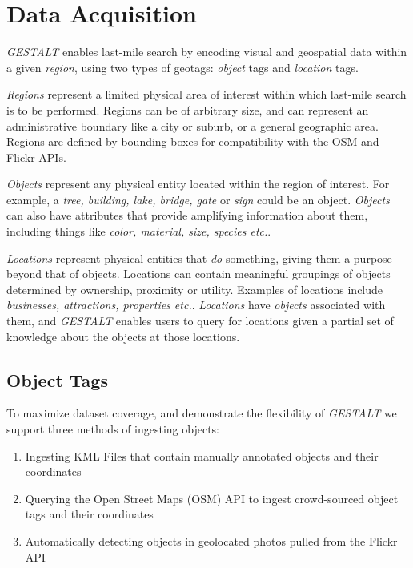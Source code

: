 \section{Data Acquisition}
\label{section:data}

\emph{GESTALT} enables last-mile search by encoding visual and geospatial data within a given \emph{region}, using two types of geotags: \emph{object} tags and \emph{location} tags.

\emph{Regions} represent a limited physical area of interest within which last-mile search is to be performed. 
Regions can be of arbitrary size, and can represent an administrative boundary like a city or suburb, or a general geographic area.
Regions are defined by bounding-boxes for compatibility with the OSM and Flickr APIs.


\emph{Objects} represent any physical entity located within the region of interest. 
For example, a \textit{tree, building, lake, bridge, gate} or \textit{sign} could be an object. 
\textit{Objects} can also have attributes that provide amplifying information about them, including things like \textit{color, material, size, species etc.}. 

\emph{Locations} represent physical entities that \textit{do} something, giving them a purpose beyond that of objects. 
Locations can contain meaningful groupings of objects determined by ownership, proximity or utility. 
Examples of locations include \textit{businesses, attractions, properties etc.}. 
\textit{Locations} have \textit{objects} associated with them, and \emph{GESTALT} enables users to query for locations given a partial set of knowledge about the objects at those locations.

\subsection{Object Tags}
To maximize dataset coverage, and demonstrate the flexibility of \emph{GESTALT} we support three methods of ingesting objects:
\begin{enumerate}
    \item Ingesting KML Files that contain manually annotated objects and their coordinates 
    \item Querying the Open Street Maps (OSM) API to ingest crowd-sourced object tags and their coordinates
    \item Automatically detecting objects in geolocated photos pulled from the Flickr API 
\end{enumerate}

